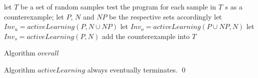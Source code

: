 \begin{algorithm}[t]
\SetAlgoVlined
\Indm
{}
\Indp
let $T$ be a set of random samples\;
 {
    test the program for each sample in $T$\;
     {
        \Return $s$ as a counterexample;
    }
    let $P$, $N$ and $NP$ be the respective sets accordingly\;
    let $Inv_u = activeLearning(P, N \cup NP)$\;
    let $Inv_o = activeLearning(P \cup NP, N)$\;
    let $Inv_s = activeLearning(P, N)$\;
     {
         {
            add the counterexample into $T$\;
        }
    }
}
\caption{Algorithm $overall$}
\label{alg:overall}
\end{algorithm}

\begin{example}
\end{example}

\begin{proposition}
Algorithm $activeLearning$ always eventually terminates. \hfill \qed
\end{proposition}


\begin{example}
\end{example}